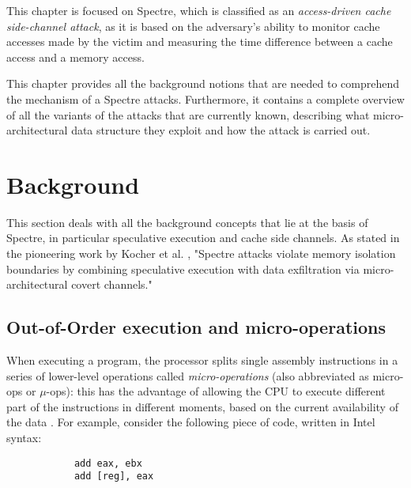 \documentclass[target=mst,aauheader=aics]{thud}
\theoremstyle{definition}
\begin{document}
	This chapter is focused on Spectre, which is classified as an \textit{access-driven cache side-channel attack}, as it is based on the adversary's ability to monitor cache accesses made by the victim and measuring the time difference between a cache access and a memory access.
	
	This chapter provides all the background notions that are needed to comprehend the mechanism of a Spectre attacks. Furthermore, it contains a complete overview of all the variants of the attacks that are currently known, describing what micro-architectural data structure they exploit and how the attack is carried out.
	\section{Background}
	This section deals with all the background concepts that lie at the basis of Spectre, in particular speculative execution and cache side channels. As stated in the pioneering work by Kocher et al. \cite{Kocher2019}, "Spectre attacks violate memory isolation boundaries by combining speculative execution with data exfiltration via micro-architectural covert channels."
	\subsection{Out-of-Order execution and micro-operations}\label{ooo-exec}
	When executing a program, the processor splits single assembly instructions in a series of lower-level operations called \textit{micro-operations} (also abbreviated as micro-ops or $\mu$-ops): this has the advantage of allowing the CPU to execute different part of the instructions in different moments, based on the current availability of the data \cite{Fog2021}. For example, consider the following piece of code, written in Intel syntax:
	
	\vspace{3mm}
	\begin{minipage}{.3\textwidth}
		\begin{lstlisting}
			add eax, ebx
			add [reg], eax
		\end{lstlisting}
	\end{minipage}
	
\end{document}
